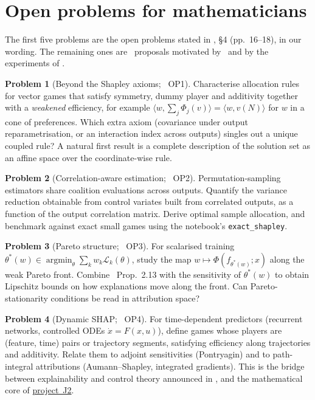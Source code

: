 \documentclass[11pt,a4paper]{article}
\newcommand{\card}[1]{\hyperref[card:#1]{project~#1}}
\theoremstyle{plain}
\theoremstyle{definition}
\newtheorem{problem}{Problem}
\theoremstyle{remark}
\newcommand{\tagbox}[2]{\tcbox[on line,boxsep=1pt,left=2pt,right=2pt,top=0pt,bottom=0pt,
  colback=#1!12!white,colframe=#1,boxrule=0.4pt,arc=1pt]{\scriptsize\bfseries\color{#1}#2}}
\newcommand{\PROP}{\tagbox{ochre}{PROPOSAL}}
\DeclareMathOperator*{\argmin}{argmin}
\begin{document}
\section{Open problems for mathematicians}
\label{sec:math}

The first five problems are the open problems stated in \PII, §4 (pp.~16--18), in our wording. The remaining ones are \PROP\ proposals motivated by \PI\ and by the experiments of \PII.

\begin{problem}[Beyond the Shapley axioms; \PII\ OP1]\label{prob:beyond}
Characterise allocation rules for vector games that satisfy symmetry, dummy player and additivity together with a \emph{weakened} efficiency, for example $\langle w,\sum_j\Phi_j(v)\rangle=\langle w,v(N)\rangle$ for $w$ in a cone of preferences. Which extra axiom (covariance under output reparametrisation, or an interaction index across outputs) singles out a unique coupled rule? A natural first result is a complete description of the solution set as an affine space over the coordinate-wise rule.
\end{problem}

\begin{problem}[Correlation-aware estimation; \PII\ OP2]\label{prob:estimation}
Permutation-sampling estimators share coalition evaluations across outputs. Quantify the variance reduction obtainable from control variates built from correlated outputs, as a function of the output correlation matrix. Derive optimal sample allocation, and benchmark against exact small games using the notebook's \texttt{exact\_shapley}.
\end{problem}

\begin{problem}[Pareto structure; \PII\ OP3]\label{prob:pareto}
For scalarised training $\theta^*(w)\in\argmin_\theta\sum_kw_k\mathcal L_k(\theta)$, study the map $w\mapsto\Phi(f_{\theta^*(w)};x)$ along the weak Pareto front. Combine \PII\ Prop.~2.13 with the sensitivity of $\theta^*(w)$ to obtain Lipschitz bounds on how explanations move along the front. Can Pareto-stationarity conditions be read in attribution space?
\end{problem}

\begin{problem}[Dynamic SHAP; \PII\ OP4]\label{prob:dynamic}
For time-dependent predictors (recurrent networks, controlled ODEs $\dot x=F(x,u)$), define games whose players are (feature, time) pairs or trajectory segments, satisfying efficiency along trajectories and additivity. Relate them to adjoint sensitivities (Pontryagin) and to path-integral attributions (Aumann--Shapley, integrated gradients). This is the bridge between explainability and control theory announced in \PII, and the mathematical core of \card{J2}.
\end{problem}
\end{document}
